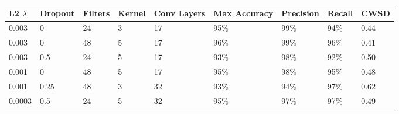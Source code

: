 \documentclass[10pt]{article}
\begin{document}
\begin{minipage}{\textwidth}
    \begin{center}
        \begin{tabular}{|l|l|l|l|l|l|l|l|l|}
            \hline
            L2 $\lambda$ & Dropout & Filters & Kernel & Conv Layers & Max Accuracy & Precision & Recall & CWSD \\
            \hline
            0.003 & 0 & 24 & 3 & 17 & 95\% & 99\% & 94\% & 0.44 \\
            \hline
            0.003 & 0 & 48 & 5 & 17 & 96\% & 99\% & 96\% & 0.41 \\
            \hline
            0.003 & 0.5 & 24 & 5 & 17 & 93\% & 98\% & 92\% & 0.50 \\
            \hline
            0.001 & 0 & 48 & 5 & 17 & 95\% & 98\% & 95\% & 0.48 \\
            \hline
            0.001 & 0.25 & 48 & 3 & 32 & 93\% & 94\% & 97\% & 0.62 \\
            \hline
            0.0003 & 0.5 & 24 & 5 & 32 & 95\% & 97\% & 97\% & 0.49 \\
            \hline
        \end{tabular}
    \end{center}
\end{minipage}
\end{document}
